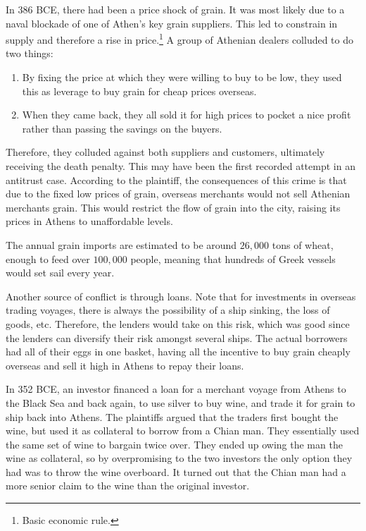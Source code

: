 \documentclass{article}
\begin{document}
    \begin{example}
      In 386 BCE, there had been a price shock of grain. It was most likely due to a naval blockade of one of Athen's key grain suppliers. This led to constrain in supply and therefore a rise in price.\footnote{Basic economic rule. } A group of Athenian dealers colluded to do two things: 
      \begin{enumerate}
        \item By fixing the price at which they were willing to buy to be low, they used this as leverage to buy grain for cheap prices overseas. 
        \item When they came back, they all sold it for high prices to pocket a nice profit rather than passing the savings on the buyers. 
      \end{enumerate}
      Therefore, they colluded against both suppliers and customers, ultimately receiving the death penalty. This may have been the first recorded attempt in an antitrust case. According to the plaintiff, the consequences of this crime is that due to the fixed low prices of grain, overseas merchants would not sell Athenian merchants grain. This would restrict the flow of grain into the city, raising its prices in Athens to unaffordable levels. 
    \end{example}

    The annual grain imports are estimated to be around $26,000$ tons of wheat, enough to feed over $100,000$ people, meaning that hundreds of Greek vessels would set sail every year. 

    Another source of conflict is through loans. Note that for investments in overseas trading voyages, there is always the possibility of a ship sinking, the loss of goods, etc. Therefore, the lenders would take on this risk, which was good since the lenders can diversify their risk amongst several ships. The actual borrowers had all of their eggs in one basket, having all the incentive to buy grain cheaply overseas and sell it high in Athens to repay their loans. 

    \begin{example}
      In 352 BCE, an investor financed a loan for a merchant voyage from Athens to the Black Sea and back again, to use silver to buy wine, and trade it for grain to ship back into Athens. The plaintiffs argued that the traders first bought the wine, but used it as collateral to borrow from a Chian man. They essentially used the same set of wine to bargain twice over. They ended up owing the man the wine as collateral, so by overpromising to the two investors the only option they had was to throw the wine overboard. It turned out that the Chian man had a more senior claim to the wine than the original investor. 
    \end{example}
\end{document}
